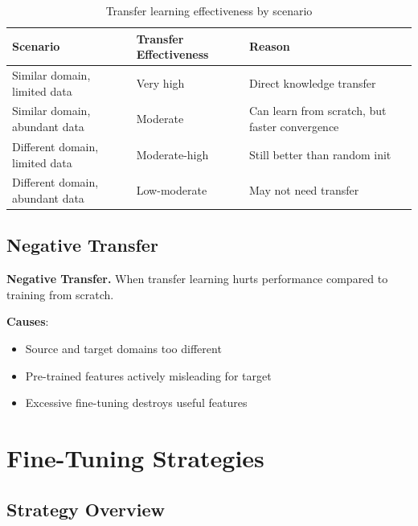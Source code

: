 \begin{table}[H]
\centering
\caption{Transfer learning effectiveness by scenario}
\begin{tabularx}{\textwidth}{lXX}
\toprule
\textbf{Scenario} & \textbf{Transfer Effectiveness} & \textbf{Reason} \\
\midrule
Similar domain, limited data & Very high & Direct knowledge transfer \\
Similar domain, abundant data & Moderate & Can learn from scratch, but faster convergence \\
Different domain, limited data & Moderate-high & Still better than random init \\
Different domain, abundant data & Low-moderate & May not need transfer \\
\bottomrule
\end{tabularx}
\end{table}

\subsection{Negative Transfer}

\textbf{Negative Transfer.} When transfer learning hurts performance compared to training from scratch.

\textbf{Causes}:
\begin{itemize}
    \item Source and target domains too different
    \item Pre-trained features actively misleading for target
    \item Excessive fine-tuning destroys useful features
\end{itemize}

\section{Fine-Tuning Strategies}
\label{sec:finetuning_strategies}

\subsection{Strategy Overview}

